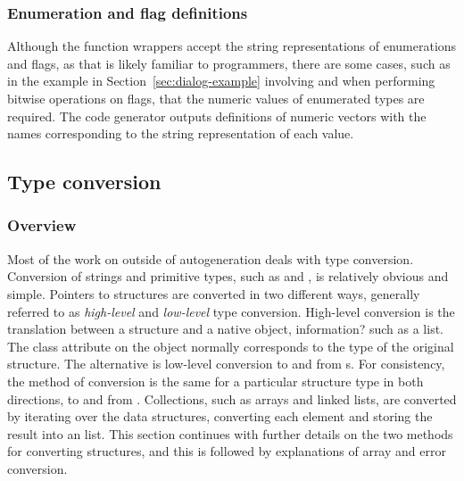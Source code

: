 \documentclass[article,shortnames]{jss}
\begin{document}
\subsubsection{Enumeration and flag definitions}
Although the function wrappers accept the string representations of
enumerations 
and flags, as that is likely familiar to  programmers,
there are
some cases, such as in the example in Section~\ref{sec:dialog-example}
involving 
 and when performing bitwise operations on
flags, that the
numeric values of enumerated types are required. The code generator
outputs 
definitions of  numeric vectors with the names
corresponding to the
string representation of each value.

\subsection{Type conversion}
\label{sec:type-conversion}

\subsubsection{Overview}

Most of the work on  outside of autogeneration deals with
type 
conversion. Conversion of strings and primitive  types,
such as  and 
, is relatively obvious and simple. Pointers to
 structures are converted
in two different ways, generally referred to as \emph{high-level}
and \emph{low-level} type conversion. 
High-level conversion is the
translation
between a  structure and a native  object,
information?
such as a list. The class attribute on the object normally corresponds
to the type of the original  structure. 
The alternative is low-level conversion to and from
 s. For consistency, the method of
conversion is 
the same for a particular structure type in both directions, to and
from .
Collections, such as arrays and linked 
lists, are converted by iterating over the data structures, converting
each
element and storing the result into an  list. This section
continues
with further details on the two methods for converting 
structures, and this is followed by explanations of array and error
conversion.
\end{document}
